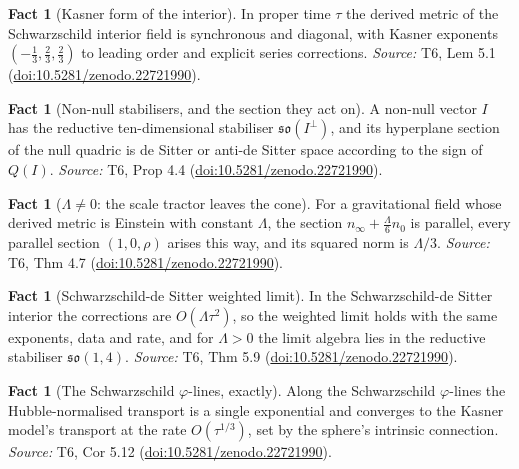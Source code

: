 \documentclass[11pt]{article}
\theoremstyle{definition}
\newtheorem{fact}[theorem]{Fact}
\theoremstyle{plain}
\providecommand{\nInf}{}\renewcommand{\nInf}{n_\infty}
\providecommand{\nO}{}\renewcommand{\nO}{n_0}
\begin{document}
\begin{fact}[Kasner form of the interior]\label{c:interior.kasner-form-interior}
In proper time $\tau$ the derived metric of the Schwarzschild interior field is synchronous and diagonal, with Kasner exponents $(-\tfrac13, \tfrac23, \tfrac23)$ to leading order and explicit series corrections.
\emph{Source:} T6, Lem 5.1 (\href{https://doi.org/10.5281/zenodo.22721990}{doi:10.5281/zenodo.22721990}).
\end{fact}

\begin{fact}[Non-null stabilisers, and the section they act on]\label{c:interior.non-null-stabilisers-section-they-act}
A non-null vector $I$ has the reductive ten-dimensional stabiliser $\mathfrak{so}(I^\perp)$, and its hyperplane section of the null quadric is de Sitter or anti-de Sitter space according to the sign of $Q(I)$.
\emph{Source:} T6, Prop 4.4 (\href{https://doi.org/10.5281/zenodo.22721990}{doi:10.5281/zenodo.22721990}).
\end{fact}

\begin{fact}[$\Lambda \neq 0$: the scale tractor leaves the cone]\label{c:interior.scale-tractor-leaves-cone}
For a gravitational field whose derived metric is Einstein with constant $\Lambda$, the section $\nInf + \tfrac{\Lambda}{6}\nO$ is parallel, every parallel section $(1, 0, \rho)$ arises this way, and its squared norm is $\Lambda/3$.
\emph{Source:} T6, Thm 4.7 (\href{https://doi.org/10.5281/zenodo.22721990}{doi:10.5281/zenodo.22721990}).
\end{fact}

\begin{fact}[Schwarzschild-de Sitter weighted limit]\label{c:interior.schwarzschild-de-sitter-weighted-limit}
In the Schwarzschild-de Sitter interior the corrections are $O(\Lambda\tau^2)$, so the weighted limit holds with the same exponents, data and rate, and for $\Lambda > 0$ the limit algebra lies in the reductive stabiliser $\mathfrak{so}(1,4)$.
\emph{Source:} T6, Thm 5.9 (\href{https://doi.org/10.5281/zenodo.22721990}{doi:10.5281/zenodo.22721990}).
\end{fact}

\begin{fact}[The Schwarzschild $\varphi$-lines, exactly]\label{c:interior.schwarzschild-lines-exactly}
Along the Schwarzschild $\varphi$-lines the Hubble-normalised transport is a single exponential and converges to the Kasner model's transport at the rate $O(\tau^{1/3})$, set by the sphere's intrinsic connection.
\emph{Source:} T6, Cor 5.12 (\href{https://doi.org/10.5281/zenodo.22721990}{doi:10.5281/zenodo.22721990}).
\end{fact}
\end{document}
